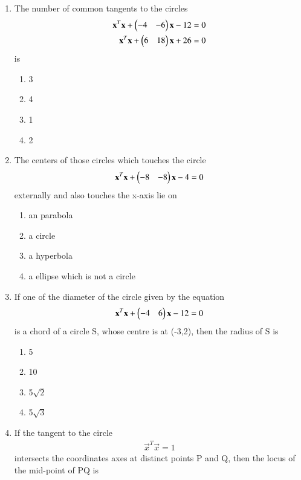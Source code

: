 \begin{enumerate}[label=\arabic*.,ref=\thesubsection.\theenumi]
\item The number of common tangents to the circles   			   	
\begin{align}
\mathbf{x}^T\mathbf{x}+\begin{pmatrix}-4&-6\end{pmatrix}\mathbf{x}-12=0\\
\mathbf{x}^T\mathbf{x}+\begin{pmatrix}6&18\end{pmatrix}\mathbf{x}+26=0
\end{align} 
is
\begin{enumerate}    
\item 3
\item 4
\item 1
\item 2
\end{enumerate}

\item The centers of those circles which touches the circle 			
\begin{align}
\mathbf x^T\mathbf x+\begin{pmatrix}-8&-8\end{pmatrix}\mathbf x-4=0
\end{align} 
externally and also touches the x-axis lie on
\begin{enumerate}
\item an parabola
\item a circle 
\item a hyperbola
\item a ellipse which is not a circle
\end{enumerate}

\item If one of the diameter of the circle given by the equation 	
\begin{align}
\mathbf x^T\mathbf x+\begin{pmatrix}-4&6\end{pmatrix}\mathbf x-12=0
\end{align}  
is a chord of a circle S, whose centre is at (-3,2), then the radius of S is
\begin{enumerate}    
\item  5
\item 10
\item 5$\sqrt{2}$
\item 5$\sqrt{3}$
\end{enumerate}

\item If the tangent to the circle 
\begin{align}
\vec x^T\vec x=1
\end{align} 
intersects the coordinates axes at distinct points P and Q, then the locus of the mid-point of PQ is
\end{enumerate}

















